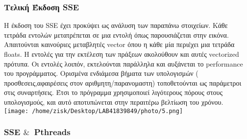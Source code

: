 \documentclass[11pt]{article}
\begin{document}
\vspace{20mm}
\subsubsection{Τελική Έκδοση SSE }
\hspace*{8mm}Η έκδοση του SSE έχει προκύψει ως ανάλυση των παραπάνω στοιχείων. Κάθε τετράδα  εντολών μετατρέπεται σε μια εντολή  όπως παρουσιάζεται στην εικόνα. Απαιτούνται καινούριες μεταβλητές vector όπου η κάθε μία περιέχει μια τετράδα floats. Η εντολές για την εκτέλεση των πράξεων ακολούθουν και αυτές vectorized πρότυπα. Οι εντολές λοιπόν, εκτελούνται παράλληλα και αυξάνεται το  performance του προγράμματος. Ορισμένα ενδιάμεσα βήματα των υπολογισμών ( προσθεσεις,αφαιρέσεις στον αριθμητη/παρανομαστη) τοποθετούνται ως παράμετροι στις συναρτήσεις. Έτσι το πρόγραμμα χρησιμοποιεί λιγότερους πόρους στους υπολογισμούς, και αυτό αποτυπώνεται στην περαιτέρω βελτίωση του χρόνου. \\


 \texttt{[image: /home/zisk/Desktop/LAB41839849/photo/5.png]}
\vspace{15mm}
\subsubsection{SSE $\&$\  Pthreads }
\end{document}
